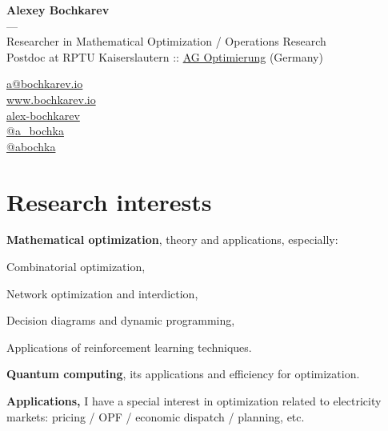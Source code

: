 \documentclass[11pt, a4paper]{article} \usepackage{geometry} %
\begin{document}
  \begin{minipage}[c]{0.74\textwidth}
    \centering
    {\LARGE \textbf{Alexey Bochkarev}}\\
    ---\\
    Researcher in Mathematical Optimization / Operations Research\\
    Postdoc at RPTU Kaiserslautern :: \href{https://math.rptu.de/en/wgs/opt/research}{AG Optimierung} (Germany)
  \end{minipage}\hfill%
  \begin{minipage}{0.26\textwidth}
    \faEnvelope \href{mailto:a@bochkarev.io}{a@bochkarev.io}\\
    \faGlobe \href{https://www.bochkarev.io}{www.bochkarev.io}\\
    \faGithub \href{https://github.com/alex-bochkarev}{alex-bochkarev}\\
    \faTwitter \href{https://twitter.com/a_bochka}{@a\_bochka}\\
    \faTelegram \href{https://t.me/abochka}{@abochka}
  \end{minipage}

  \vspace{1.0em}
  \section*{Research interests}
  \textbf{Mathematical optimization}, theory and applications, especially:\vspace{0.3em}
  \begin{itemize}
    \begin{minipage}{0.5\linewidth}
      \item Combinatorial optimization,
      \item Network optimization and interdiction,
    \end{minipage}
    \begin{minipage}{0.5\linewidth}
      \item Decision diagrams and dynamic programming,
      \item Applications of reinforcement learning techniques.
    \end{minipage}
  \end{itemize}


  \noindent \textbf{Quantum computing}, its applications and efficiency for optimization.\vspace{1em}

  \noindent
  \textbf{Applications,} I have a special interest in optimization related to
  electricity markets: pricing / OPF / economic dispatch / planning,
  etc.\vspace{1em}
\end{document}
